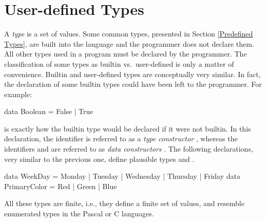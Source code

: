 \section{User-defined Types}

A \emph{type} is a set of values.
Some common types, presented in Section \ref{Predefined Types},
are built into the language
and the programmer does not declare them.
All other types used in a program must be declared by the programmer.
The classification of some types as builtin vs.~user-defined 
is only a matter of convenience.
Builtin and user-defined types are conceptually very similar.
In fact,
the declaration of some builtin types could have been left to the programmer.
For example:
%
\begin{prog}
data Boolean = False | True
\end{prog}
%
is exactly how the builtin  type would be declared
if it were not builtin.
In this declaration, the identifier 
is referred to as a \emph{type constructor}%
,
whereas the identifiers  and 
are referred to as \emph{data constructors}%
.
The following declarations, very similar to the previous one,
define plausible types  and .
%
\begin{prog}
data WeekDay = Monday | Tuesday | Wednesday | Thursday | Friday
data PrimaryColor = Red | Green | Blue
\end{prog}
%
All these types are finite, i.e., they define a finite set of values,
and resemble enumerated types in the Pascal or C languages.

